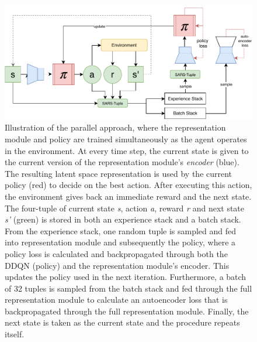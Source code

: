 \begin{figure}[t]
	\centering
	\includegraphics[width=\textwidth]{img/full-model.pdf}
	\caption{Illustration of the parallel approach, where the representation module and policy are trained simultaneously as the agent operates in the environment. At every time step, the current state is given to the current version of the representation module's \textit{encoder} (blue). The resulting latent space representation is used by the current policy (red) to decide on the best action. After executing this action, the environment gives back an immediate reward and the next state. The four-tuple of current state \textit{s}, action \textit{a}, reward \textit{r} and next state \textit{s'} (green) is stored in both an experience stack and a batch stack. From the experience stack, one random tuple is sampled and fed into representation module and subsequently the policy, where a policy loss is calculated and backpropagated through both the DDQN (policy) and the representation module's encoder. This updates the policy used in the next iteration. Furthermore, a batch of 32 tuples is sampled from the batch stack and fed through the full representation module to calculate an autoencoder loss that is backpropagated through the full representation module. Finally, the next state is taken as the current state and the procedure repeats itself. \label{fig:approaches}}
\end{figure}

